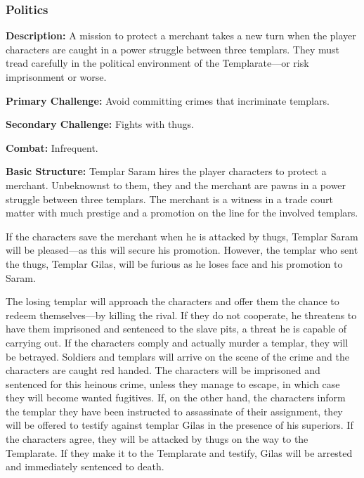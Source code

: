 \subsubsection{Politics}

\textbf{Description:} A mission to protect a merchant takes a new turn when the player characters are caught in a power struggle between three templars. They must tread carefully in the political environment of the Templarate---or risk imprisonment or worse.

\textbf{Primary Challenge:} Avoid committing crimes that incriminate templars.

\textbf{Secondary Challenge:} Fights with thugs.

\textbf{Combat:} Infrequent.

\textbf{Basic Structure:} Templar Saram hires the player characters to protect a merchant. Unbeknownst to them, they and the merchant are pawns in a power struggle between three templars. The merchant is a witness in a trade court matter with much prestige and a promotion on the line for the involved templars.

If the characters save the merchant when he is attacked by thugs, Templar Saram will be pleased---as this will secure his promotion. However, the templar who sent the thugs, Templar Gilas, will be furious as he loses face and his promotion to Saram.

The losing templar will approach the characters and offer them the chance to redeem themselves---by killing the rival. If they do not cooperate, he threatens to have them imprisoned and sentenced to the slave pits, a threat he is capable of carrying out. If the characters comply and actually murder a templar, they will be betrayed. Soldiers and templars will arrive on the scene of the crime and the characters are caught red handed. The characters will be imprisoned and sentenced for this heinous crime, unless they manage to escape, in which case they will become wanted fugitives. If, on the other hand, the characters inform the templar they have been instructed to assassinate of their assignment, they will be offered to testify against templar Gilas in the presence of his superiors. If the characters agree, they will be attacked by thugs on the way to the Templarate. If they make it to the Templarate and testify, Gilas will be arrested and immediately sentenced to death.

